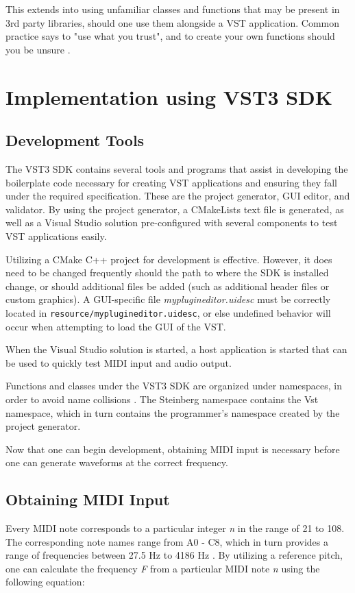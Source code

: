 \documentclass[12pt]{article}
\begin{document}
This extends into using unfamiliar classes and functions that may be present in 3rd party libraries, should one use them alongside a VST application. Common practice says to "use what you trust", and to create your own functions should you be unsure \cite{Goodlife}.

\newpage
\section{Implementation using VST3 SDK}

\subsection{Development Tools}
The VST3 SDK contains several tools and programs that assist in developing the boilerplate code necessary for creating VST applications and ensuring they fall under the required specification. These are the project generator, GUI editor, and validator. By using the project generator, a CMakeLists text file is generated, as well as a Visual Studio solution pre-configured with several components to test VST applications easily. 

Utilizing a CMake C++ project for development is effective. However, it does need to be changed frequently should the path to where the SDK is installed change, or should additional files be added (such as additional header files or custom graphics). A GUI-specific file \textit{myplugineditor.uidesc} must be correctly located in \verb*|resource/myplugineditor.uidesc|, or else undefined behavior will occur when attempting to load the GUI of the VST.

When the Visual Studio solution is started, a host application is started that can be used to quickly test MIDI input and audio output. 

Functions and classes under the VST3 SDK are organized under namespaces, in order to avoid name collisions \cite{Pirkle_2015}. The Steinberg namespace contains the Vst namespace, which in turn contains the programmer's namespace created by the project generator. 

Now that one can begin development, obtaining MIDI input is necessary before one can generate waveforms at the correct frequency. 

\newpage
\subsection{Obtaining MIDI Input}
Every MIDI note corresponds to a particular integer \textit{n} in the range of 21 to 108. The corresponding note names range from A0 - C8, which in turn provides a range of frequencies between 27.5 Hz to 4186 Hz \cite{MIDI_online}. By utilizing a reference pitch, one can calculate the frequency \textit{F} from a particular MIDI note \textit{n} using the following equation:
\end{document}
